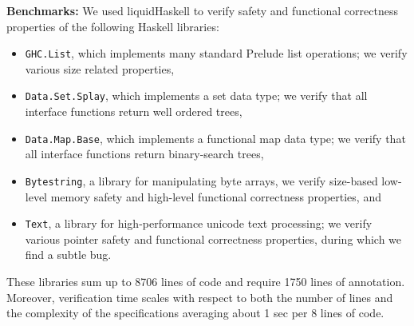 \textbf{Benchmarks:}
We used liquidHaskell to verify safety and functional correctness properties of the following Haskell libraries:

\begin{itemize}
\item \texttt{GHC.List}, which implements many standard Prelude list
operations; we verify various size related properties,
\item \texttt{Data.Set.Splay}, which implements a set data type; 
we verify that all interface functions return well ordered trees,
\item \texttt{Data.Map.Base}, which implements a functional map data
type; we verify that all interface functions return
binary-search trees,
\item \texttt{Bytestring}, a library for manipulating byte arrays, we 
verify size-based low-level memory safety and high-level 
functional correctness properties, and
\item \texttt{Text}, a library for high-performance unicode text processing; 
we verify various pointer safety and functional correctness
properties, during which we find a subtle bug.
\end{itemize}

These libraries sum up to 8706 lines of code and require 
1750 lines of annotation.
Moreover, verification time scales
with respect to both the number of lines 
and the complexity of the specifications
averaging about 1 sec per 8 lines of code.

